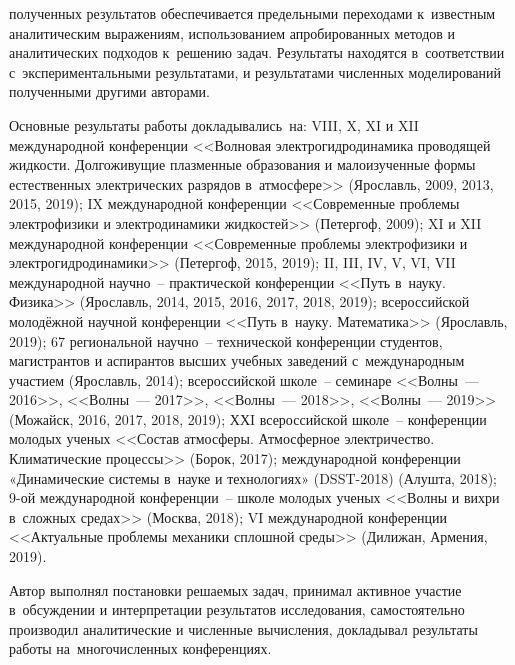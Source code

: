 {\reliability} полученных результатов обеспечивается предельными переходами к~известным аналитическим выражениям, использованием апробированных методов и аналитических подходов к~решению задач. Результаты находятся в~соответствии с~экспериментальными результатами, и результатами численных моделирований полученными другими авторами.


{\probation}
Основные результаты работы докладывались~на:
VIII, X, XI и XII международной конференции <<Волновая электрогидродинамика проводящей жидкости. Долгоживущие плазменные образования и малоизученные формы естественных электрических разрядов в~атмосфере>> (Ярославль, 2009, 2013, 2015, 2019); IX международной конференции <<Современные проблемы электрофизики и электродинамики жидкостей>> (Петергоф, 2009); XI и XII международной конференции <<Современные проблемы электрофизики и электрогидродинамики>> (Петергоф, 2015, 2019); II, III, IV, V, VI, VII международной научно~-- практической конференции <<Путь в~науку. Физика>> (Ярославль, 2014, 2015, 2016, 2017, 2018, 2019); всероссийской молодёжной  научной конференции <<Путь в~науку. Математика>> (Ярославль, 2019); 67 региональной научно~-- технической конференции студентов, магистрантов и аспирантов высших учебных заведений с~международным участием (Ярославль, 2014); всероссийской школе~-- семинаре <<Волны~--- 2016>>, <<Волны~--- 2017>>, <<Волны~--- 2018>>, <<Волны~--- 2019>> (Можайск, 2016, 2017, 2018, 2019); ХХI всероссийской школе~-- конференции молодых ученых <<Состав атмосферы. Атмосферное электричество. Климатические процессы>> (Борок, 2017); международной конференции «Динамические системы в~науке и технологиях» (DSST-2018) (Алушта, 2018); 9-ой международной конференции~-- школе молодых ученых <<Волны и вихри в~сложных средах>> (Москва, 2018); VI международной конференции <<Актуальные проблемы механики сплошной среды>> (Дилижан, Армения, 2019).

{\contribution} Автор выполнял постановки решаемых задач, принимал активное участие в~обсуждении и интерпретации результатов исследования, самостоятельно производил аналитические и численные вычисления, докладывал результаты работы на~многочисленных конференциях.

